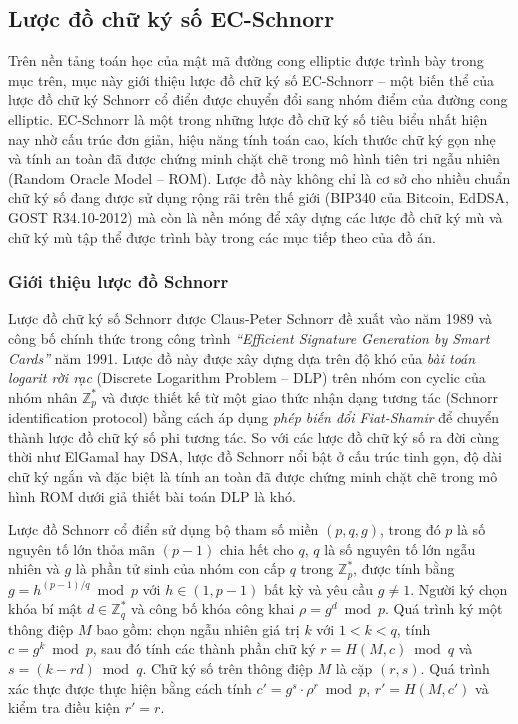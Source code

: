\subsection{Lược đồ chữ ký số EC-Schnorr}
\label{sec:luoc-do-ec-schnorr}

Trên nền tảng toán học của mật mã đường cong elliptic được trình bày trong mục trên, mục này giới thiệu lược đồ chữ ký số EC-Schnorr -- một biến thể của lược đồ chữ ký Schnorr cổ điển được chuyển đổi sang nhóm điểm của đường cong elliptic. EC-Schnorr là một trong những lược đồ chữ ký số tiêu biểu nhất hiện nay nhờ cấu trúc đơn giản, hiệu năng tính toán cao, kích thước chữ ký gọn nhẹ và tính an toàn đã được chứng minh chặt chẽ trong mô hình tiên tri ngẫu nhiên (Random Oracle Model -- ROM). Lược đồ này không chỉ là cơ sở cho nhiều chuẩn chữ ký số đang được sử dụng rộng rãi trên thế giới (BIP340 của Bitcoin, EdDSA, GOST R34.10-2012) mà còn là nền móng để xây dựng các lược đồ chữ ký mù và chữ ký mù tập thể được trình bày trong các mục tiếp theo của đồ án.

\subsubsection{Giới thiệu lược đồ Schnorr}

Lược đồ chữ ký số Schnorr được Claus-Peter Schnorr đề xuất vào năm 1989 và công bố chính thức trong công trình \textit{``Efficient Signature Generation by Smart Cards''} năm 1991. Lược đồ này được xây dựng dựa trên độ khó của \textit{bài toán logarit rời rạc} (Discrete Logarithm Problem -- DLP) trên nhóm con cyclic của nhóm nhân $\mathbb{Z}_p^*$ và được thiết kế từ một giao thức nhận dạng tương tác (Schnorr identification protocol) bằng cách áp dụng \textit{phép biến đổi Fiat-Shamir} để chuyển thành lược đồ chữ ký số phi tương tác. So với các lược đồ chữ ký số ra đời cùng thời như ElGamal hay DSA, lược đồ Schnorr nổi bật ở cấu trúc tinh gọn, độ dài chữ ký ngắn và đặc biệt là tính an toàn đã được chứng minh chặt chẽ trong mô hình ROM dưới giả thiết bài toán DLP là khó.

Lược đồ Schnorr cổ điển sử dụng bộ tham số miền $(p, q, g)$, trong đó $p$ là số nguyên tố lớn thỏa mãn $(p-1)$ chia hết cho $q$, $q$ là số nguyên tố lớn ngẫu nhiên và $g$ là phần tử sinh của nhóm con cấp $q$ trong $\mathbb{Z}_p^*$, được tính bằng $g = h^{(p-1)/q} \bmod p$ với $h \in (1, p-1)$ bất kỳ và yêu cầu $g \neq 1$. Người ký chọn khóa bí mật $d \in \mathbb{Z}_q^*$ và công bố khóa công khai $\rho = g^d \bmod p$. Quá trình ký một thông điệp $M$ bao gồm: chọn ngẫu nhiên giá trị $k$ với $1 < k < q$, tính $c = g^k \bmod p$, sau đó tính các thành phần chữ ký $r = H(M, c) \bmod q$ và $s = (k - r d) \bmod q$. Chữ ký số trên thông điệp $M$ là cặp $(r, s)$. Quá trình xác thực được thực hiện bằng cách tính $c' = g^s \cdot \rho^r \bmod p$, $r' = H(M, c')$ và kiểm tra điều kiện $r' = r$.

